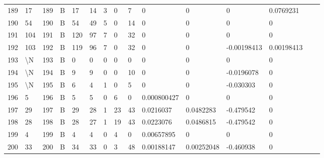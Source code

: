 \begin{longtable}{lllllllllllllll}
	189 & 17                & 189 & B   & 17                & 14                & 3                 & 0    & 7          & 0              & 0              & 0             & 0.0769231    \\
	190 & 54                & 190 & B   & 54                & 49                & 5                 & 0    & 14         & 0              & 0              & 0             & 0            \\
	191 & 104               & 191 & B   & 120               & 97                & 7                 & 0    & 32         & 0              & 0              & 0             & 0            \\
	192 & 103               & 192 & B   & 119               & 96                & 7                 & 0    & 32         & 0              & 0              & -0.00198413   & 0.00198413   \\
	193 & \textbackslash{}N & 193 & B   & 0                 & 0                 & 0                 & 0    & 0          & 0              & 0              & 0             & 0            \\
	194 & \textbackslash{}N & 194 & B   & 9                 & 9                 & 0                 & 0    & 10         & 0              & 0              & -0.0196078    & 0            \\
	195 & \textbackslash{}N & 195 & B   & 6                 & 4                 & 1                 & 0    & 5          & 0              & 0              & -0.030303     & 0            \\
	196 & 5                 & 196 & B   & 5                 & 5                 & 0                 & 6    & 0          & 0.000800427    & 0              & 0             & 0            \\
	197 & 29                & 197 & B   & 29                & 28                & 1                 & 23   & 43         & 0.0216037      & 0.0482283      & -0.479542     & 0            \\
	198 & 28                & 198 & B   & 28                & 27                & 1                 & 19   & 43         & 0.0223076      & 0.0486815      & -0.479542     & 0            \\
	199 & 4                 & 199 & B   & 4                 & 4                 & 0                 & 4    & 0          & 0.00657895     & 0              & 0             & 0            \\
	200 & 33                & 200 & B   & 34                & 33                & 0                 & 3    & 48         & 0.00188147     & 0.00252048     & -0.460938     & 0            \\

\end{longtable}
